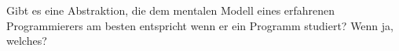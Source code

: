 \begin{em}Gibt es eine Abstraktion, die dem mentalen Modell eines erfahrenen Programmierers am besten entspricht wenn er ein Programm studiert? Wenn ja, welches?\end{em}

